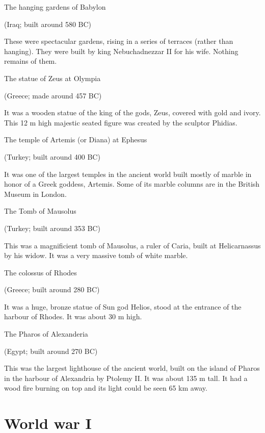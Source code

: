 \documentclass[
  openany]{book}
\begin{document}
The hanging gardens of Babylon

(Iraq; built around 580 BC)

These were spectacular gardens, rising in a series of terraces (rather than hanging). They were built by king Nebuchadnezzar II for his wife. Nothing remains of them.

The statue of Zeus at Olympia

(Greece; made around 457 BC)

It was a wooden statue of the king of the gods, Zeus, covered with gold and ivory. This 12 m high majestic seated figure was created by the sculptor Phidias.

The temple of Artemis (or Diana) at Ephesus

(Turkey; built around 400 BC)

It was one of the largest temples in the ancient world built mostly of marble in honor of a Greek goddess, Artemis. Some of its marble columns are in the British Museum in London.

The Tomb of Mausolus

(Turkey; built around 353 BC)

This was a magnificient tomb of Mausolus, a ruler of Caria, built at Helicarnassus by his widow. It was a very massive tomb of white marble.

The colossus of Rhodes

(Greece; built around 280 BC)

It was a huge, bronze statue of Sun god Helios, stood at the entrance of the harbour of Rhodes. It was about 30 m high.

The Pharos of Alexanderia

(Egypt; built around 270 BC)

This was the largest lighthouse of the ancient world, built on the island of Pharos in the harbour of Alexandria by Ptolemy II. It was about 135 m tall. It had a wood fire burning on top and its light could be seen 65 km away.

\hypertarget{world-war-i}{%
\section{World war I}\label{world-war-i}}
\end{document}
